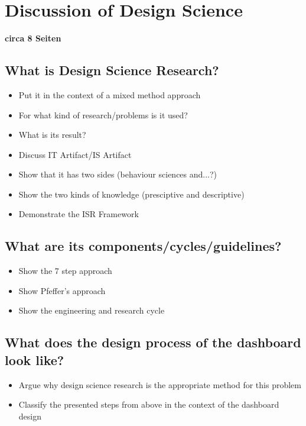 \chapter{Discussion of Design Science}
\textbf{circa 8 Seiten}

\section{What is Design Science Research?} 
\begin{itemize}
    \item Put it in the context of a mixed method approach
    \item For what kind of research/problems is it used?
    \item What is its result?
    \item Discuss IT Artifact/IS Artifact
    \item Show that it has two sides (behaviour sciences and...?)
    \item Show the two kinds of knowledge (presciptive and descriptive)
    \item Demonstrate the ISR Framework
\end{itemize}

\section{What are its components/cycles/guidelines?}
\begin{itemize}
    \item Show the 7 step approach
    \item Show Pfeffer's approach
    \item Show the engineering and research cycle
\end{itemize}

\section{What does the design process of the dashboard look like?}
\begin{itemize}
    \item Argue why design science research is the appropriate method for this problem
    \item Classify the presented steps from above in the context of the dashboard design
\end{itemize}